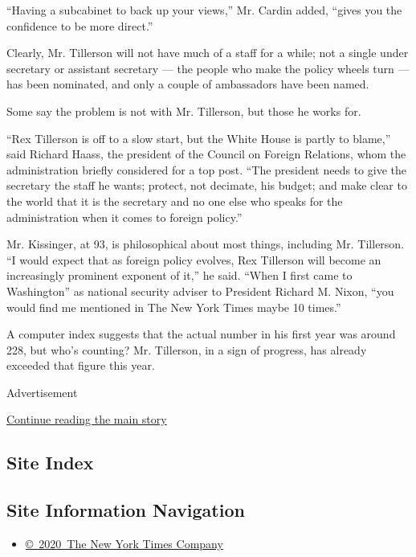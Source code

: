 ``Having a subcabinet to back up your views,'' Mr. Cardin added, ``gives
you the confidence to be more direct.''

Clearly, Mr. Tillerson will not have much of a staff for a while; not a
single under secretary or assistant secretary --- the people who make
the policy wheels turn --- has been nominated, and only a couple of
ambassadors have been named.

Some say the problem is not with Mr. Tillerson, but those he works for.

``Rex Tillerson is off to a slow start, but the White House is partly to
blame,'' said Richard Haass, the president of the Council on Foreign
Relations, whom the administration briefly considered for a top post.
``The president needs to give the secretary the staff he wants; protect,
not decimate, his budget; and make clear to the world that it is the
secretary and no one else who speaks for the administration when it
comes to foreign policy.''

Mr. Kissinger, at 93, is philosophical about most things, including Mr.
Tillerson. ``I would expect that as foreign policy evolves, Rex
Tillerson will become an increasingly prominent exponent of it,'' he
said. ``When I first came to Washington'' as national security adviser
to President Richard M. Nixon, ``you would find me mentioned in The New
York Times maybe 10 times.''

A computer index suggests that the actual number in his first year was
around 228, but who's counting? Mr. Tillerson, in a sign of progress,
has already exceeded that figure this year.

Advertisement

\protect\hyperlink{after-bottom}{Continue reading the main story}

\hypertarget{site-index}{%
\subsection{Site Index}\label{site-index}}

\hypertarget{site-information-navigation}{%
\subsection{Site Information
Navigation}\label{site-information-navigation}}

\begin{itemize}
\tightlist
\item
  \href{https://help.nytimes.com/hc/en-us/articles/115014792127-Copyright-notice}{©~2020~The
  New York Times Company}
\end{itemize}

